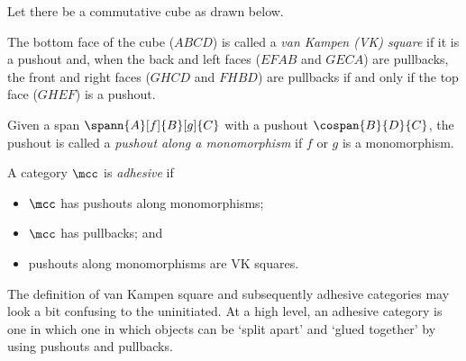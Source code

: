 \begin{definition}
    Let there be a commutative cube as drawn below.
    \begin{center}
    \end{center}
    The bottom face of the cube (\(ABCD\)) is called a
    \emph{van Kampen (VK) square} if it is a pushout and, when the back and
    left faces (\(EFAB\) and \(GECA\)) are pullbacks, the front and right faces
    (\(GHCD\) and \(FHBD\)) are pullbacks if and only if the top face (\(GHEF\))
    is a pushout.
\end{definition}

\begin{definition}
    Given a span \(\spann{A}[f]{B}[g]{C}\) with a pushout \(\cospan{B}{D}{C}\),
    the pushout is called a \emph{pushout along a monomorphism} if \(f\) or
    \(g\) is a monomorphism.
\end{definition}

\begin{definition}
    A category \(\mcc\) is \emph{adhesive} if
    \begin{itemize}
        \item \(\mcc\) has pushouts along monomorphisms;
        \item \(\mcc\) has pullbacks; and
        \item pushouts along monomorphisms are VK squares.
    \end{itemize}
\end{definition}

The definition of van Kampen square and subsequently adhesive categories may
look a bit confusing to the uninitiated.
At a high level, an adhesive category is one in which one in which objects can
be `split apart' and `glued together' by using pushouts and pullbacks.

